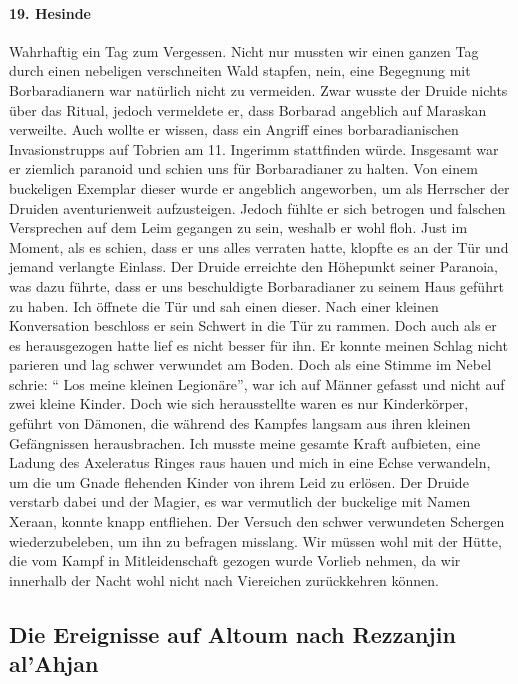 \paragraph{19. Hesinde}
Wahrhaftig ein Tag zum Vergessen. Nicht nur mussten wir einen ganzen Tag durch einen nebeligen verschneiten Wald stapfen, nein, eine Begegnung mit Borbaradianern war natürlich nicht zu vermeiden. Zwar wusste der Druide nichts über das Ritual, jedoch vermeldete er, dass Borbarad angeblich auf Maraskan verweilte. Auch wollte er wissen, dass ein Angriff eines borbaradianischen Invasionstrupps auf Tobrien am 11. Ingerimm stattfinden würde. Insgesamt war er ziemlich paranoid und schien uns für Borbaradianer zu halten. Von einem buckeligen Exemplar dieser wurde er angeblich angeworben, um als Herrscher der Druiden aventurienweit aufzusteigen. Jedoch fühlte er sich betrogen und falschen Versprechen auf dem Leim gegangen zu sein, weshalb er wohl floh. Just im Moment, als es schien, dass er uns alles verraten hatte, klopfte es an der Tür und jemand verlangte Einlass. Der Druide erreichte den Höhepunkt seiner Paranoia, was dazu führte, dass er uns beschuldigte Borbaradianer zu seinem Haus geführt zu haben. Ich öffnete die Tür und sah einen dieser. Nach einer kleinen Konversation beschloss er sein Schwert in die Tür zu rammen. Doch auch als er es herausgezogen hatte lief es nicht besser für ihn. Er konnte meinen Schlag nicht parieren und lag schwer verwundet am Boden. Doch als eine Stimme im Nebel schrie: `` Los meine kleinen Legionäre'', war ich auf Männer gefasst und nicht auf zwei kleine Kinder. Doch wie sich herausstellte waren es nur Kinderkörper, geführt von Dämonen, die während des Kampfes langsam aus ihren kleinen Gefängnissen herausbrachen. Ich musste meine gesamte Kraft aufbieten, eine Ladung des Axeleratus Ringes raus hauen und mich in eine Echse verwandeln, um die um Gnade flehenden Kinder von ihrem Leid zu erlösen. Der Druide verstarb dabei und der Magier, es war vermutlich der buckelige mit Namen Xeraan, konnte knapp entfliehen. Der Versuch den schwer verwundeten Schergen wiederzubeleben, um ihn zu befragen misslang. Wir müssen wohl mit der Hütte, die vom Kampf in Mitleidenschaft gezogen wurde Vorlieb nehmen, da wir innerhalb der Nacht wohl nicht nach Viereichen zurückkehren können.

\subsection{Die Ereignisse auf Altoum nach Rezzanjin al'Ahjan}

